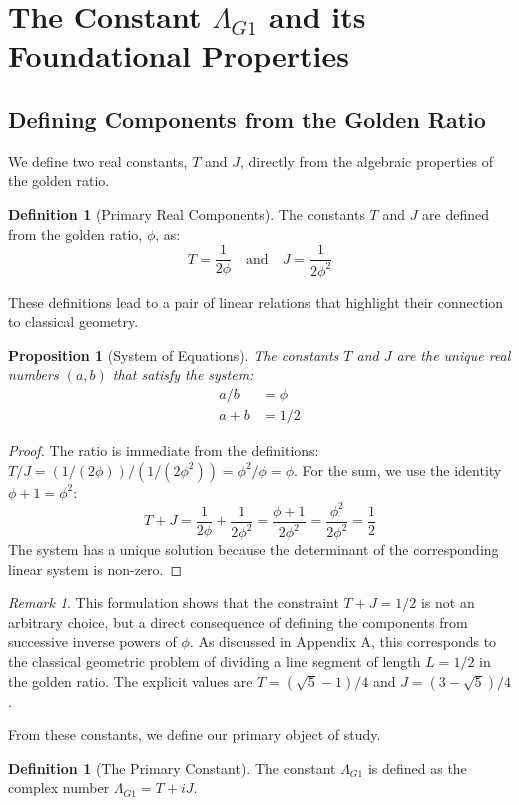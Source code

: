 \documentclass{amsart}
\theoremstyle{plain}
\newtheorem{proposition}[theorem]{Proposition}
\theoremstyle{definition}
\newtheorem{definition}[theorem]{Definition}
\theoremstyle{remark}
\newtheorem*{remark}{Remark}
\newcommand{\LambdaG}{\Lambda_{G1}}
\begin{document}
\section{The Constant \texorpdfstring{$\LambdaG$}{Lambda\_G1} and its Foundational Properties}

\subsection{Defining Components from the Golden Ratio}
We define two real constants, $T$ and $J$, directly from the algebraic properties of the golden ratio.
\begin{definition}[Primary Real Components]
The constants $T$ and $J$ are defined from the golden ratio, $\phi$, as:
$$ T = \frac{1}{2\phi} \quad \text{and} \quad J = \frac{1}{2\phi^2} $$
\end{definition}

These definitions lead to a pair of linear relations that highlight their connection to classical geometry.
\begin{proposition}[System of Equations]
The constants $T$ and $J$ are the unique real numbers $(a,b)$ that satisfy the system:
\begin{align}
    a/b &= \phi \\
    a+b &= 1/2
\end{align}
\end{proposition}
\begin{proof}
The ratio is immediate from the definitions: $T/J = (1/(2\phi))/(1/(2\phi^2)) = \phi^2/\phi = \phi$. For the sum, we use the identity $\phi+1 = \phi^2$:
$$ T+J = \frac{1}{2\phi} + \frac{1}{2\phi^2} = \frac{\phi+1}{2\phi^2} = \frac{\phi^2}{2\phi^2} = \frac{1}{2} $$
The system has a unique solution because the determinant of the corresponding linear system is non-zero.
\end{proof}

\begin{remark}
This formulation shows that the constraint $T+J=1/2$ is not an arbitrary choice, but a direct consequence of defining the components from successive inverse powers of $\phi$. As discussed in Appendix A, this corresponds to the classical geometric problem of dividing a line segment of length $L=1/2$ in the golden ratio. The explicit values are $T = (\sqrt{5}-1)/4$ and $J = (3-\sqrt{5})/4$.
\end{remark}

From these constants, we define our primary object of study.
\begin{definition}[The Primary Constant]
The constant $\LambdaG$ is defined as the complex number $\LambdaG = T+iJ$.
\end{definition}
\end{document}
